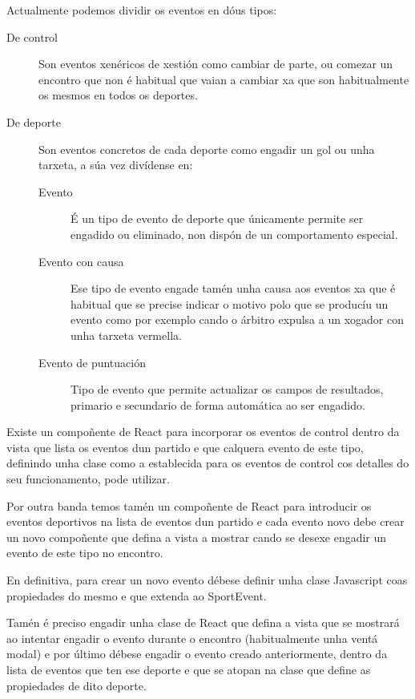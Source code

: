   Actualmente podemos dividir os eventos en dóus tipos:

  \begin{description}
    \item [De control] Son eventos xenéricos de xestión como cambiar de parte, 
ou comezar un encontro que non é habitual que vaian a cambiar xa que son 
habitualmente os mesmos en todos os deportes.
    \item [De deporte] Son eventos concretos de cada deporte como engadir un gol 
ou unha tarxeta, a súa vez divídense en:
      \begin{description}
       \item [Evento] É un tipo de evento de deporte que únicamente permite ser 
engadido ou eliminado, non dispón de un comportamento especial.
       \item [Evento con causa] Ese tipo de evento engade tamén unha causa aos 
eventos xa que é habitual que se precise indicar o motivo polo que se producíu 
un evento como por exemplo cando o árbitro expulsa a un xogador con unha 
tarxeta vermella.
         \item [Evento de puntuación] Tipo de evento que permite actualizar os 
campos de resultados, primario e secundario de forma automática ao ser engadido.
      \end{description}

  \end{description}

  Existe un compoñente de React para incorporar os eventos de control dentro 
da vista que lista os eventos dun partido e que calquera evento de este tipo, 
definindo unha clase como a establecida para os eventos de control cos detalles 
do seu funcionamento, pode utilizar.

  Por outra banda temos tamén un compoñente de React para introducir os eventos 
deportivos na lista de eventos dun partido e cada evento novo debe crear un 
novo compoñente que defina a vista a mostrar cando se desexe engadir un evento 
de este tipo no encontro.

  En definitiva, para crear un novo evento débese definir unha clase Javascript 
coas propiedades do mesmo e que extenda ao SportEvent.

  Tamén é preciso engadir unha clase de React que defina a vista que se 
mostrará ao intentar engadir o evento durante o encontro (habitualmente unha 
ventá modal) e por último débese engadir o evento creado anteriormente, dentro 
da lista de eventos que ten ese deporte e que se atopan na clase que define as 
propiedades de dito deporte.

